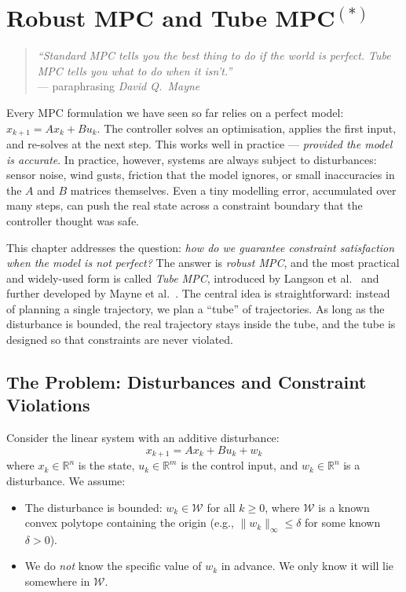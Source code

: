 \chapter{Robust MPC and Tube MPC\texorpdfstring{$^{(*)}$}{(*)}}
\label{chap:tube_mpc}

\begin{quote}
	\textit{``Standard MPC tells you the best thing to do if the world is perfect. Tube MPC tells you what to do when it isn't.''} \\
	\hfill --- paraphrasing \emph{David Q.\ Mayne}
\end{quote}

Every MPC formulation we have seen so far relies on a perfect model: $x_{k+1} = Ax_k + Bu_k$. The controller solves an optimisation, applies the first input, and re-solves at the next step. This works well in practice --- \emph{provided the model is accurate}. In practice, however, systems are always subject to disturbances: sensor noise, wind gusts, friction that the model ignores, or small inaccuracies in the $A$ and $B$ matrices themselves. Even a tiny modelling error, accumulated over many steps, can push the real state across a constraint boundary that the controller thought was safe.

This chapter addresses the question: \emph{how do we guarantee constraint satisfaction when the model is not perfect?} The answer is \emph{robust MPC}, and the most practical and widely-used form is called \emph{Tube MPC}, introduced by Langson et al.~\cite{Langson2004} and further developed by Mayne et al.~\cite{Mayne2005}. The central idea is straightforward: instead of planning a single trajectory, we plan a ``tube'' of trajectories. As long as the disturbance is bounded, the real trajectory stays inside the tube, and the tube is designed so that constraints are never violated.

\section{The Problem: Disturbances and Constraint Violations}
\label{sec:tube_problem}

Consider the linear system with an additive disturbance:
\begin{equation} \label{eq:uncertain_system}
	x_{k+1} = Ax_k + Bu_k + w_k
\end{equation}
where $x_k \in \mathbb{R}^n$ is the state, $u_k \in \mathbb{R}^m$ is the control input, and $w_k \in \mathbb{R}^n$ is a disturbance. We assume:
\begin{itemize}[noitemsep]
	\item The disturbance is bounded: $w_k \in \mathcal{W}$ for all $k \ge 0$, where $\mathcal{W}$ is a known convex polytope containing the origin (e.g., $\|w_k\|_\infty \le \delta$ for some known $\delta > 0$).
	\item We do \emph{not} know the specific value of $w_k$ in advance. We only know it will lie somewhere in $\mathcal{W}$.
\end{itemize}


